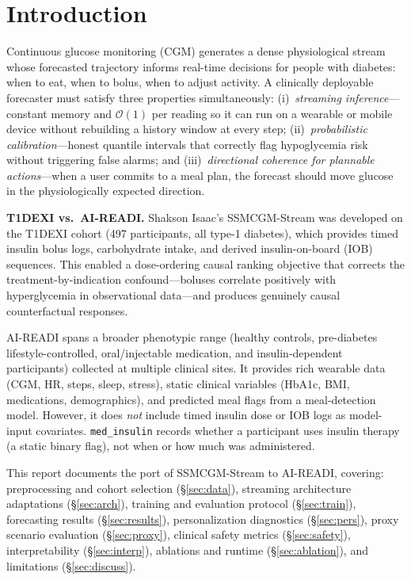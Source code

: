 \section{Introduction}

Continuous glucose monitoring (CGM) generates a dense physiological stream whose forecasted
trajectory informs real-time decisions for people with diabetes: when to eat, when to bolus,
when to adjust activity.
A clinically deployable forecaster must satisfy three properties simultaneously:
(i)~\emph{streaming inference}---constant memory and $\mathcal{O}(1)$ per reading so it can
run on a wearable or mobile device without rebuilding a history window at every step;
(ii)~\emph{probabilistic calibration}---honest quantile intervals that correctly flag
hypoglycemia risk without triggering false alarms; and
(iii)~\emph{directional coherence for plannable actions}---when a user commits to a meal plan,
the forecast should move glucose in the physiologically expected direction.

\textbf{T1DEXI vs.\ AI-READI.}
Shakson Isaac's SSMCGM-Stream \citep{riddell2023t1dexi} was developed on the T1DEXI cohort
(497 participants, all type-1 diabetes), which provides timed insulin bolus logs,
carbohydrate intake, and derived insulin-on-board (IOB) sequences.
This enabled a dose-ordering causal ranking objective that corrects the treatment-by-indication
confound---boluses correlate positively with hyperglycemia in observational data---and produces
genuinely causal counterfactual responses.

AI-READI \citep{aireadi2024} spans a broader phenotypic range (healthy controls,
pre-diabetes lifestyle-controlled, oral/injectable medication, and insulin-dependent
participants) collected at multiple clinical sites.
It provides rich wearable data (CGM, HR, steps, sleep, stress), static clinical variables
(HbA1c, BMI, medications, demographics), and predicted meal flags from a meal-detection model.
However, it does \emph{not} include timed insulin dose or IOB logs as model-input covariates.
\texttt{med\_insulin} records whether a participant uses insulin therapy (a static binary
flag), not when or how much was administered.

This report documents the port of SSMCGM-Stream to AI-READI, covering:
preprocessing and cohort selection (\S\ref{sec:data}),
streaming architecture adaptations (\S\ref{sec:arch}),
training and evaluation protocol (\S\ref{sec:train}),
forecasting results (\S\ref{sec:results}),
personalization diagnostics (\S\ref{sec:pers}),
proxy scenario evaluation (\S\ref{sec:proxy}),
clinical safety metrics (\S\ref{sec:safety}),
interpretability (\S\ref{sec:interp}),
ablations and runtime (\S\ref{sec:ablation}), and
limitations (\S\ref{sec:discuss}).
